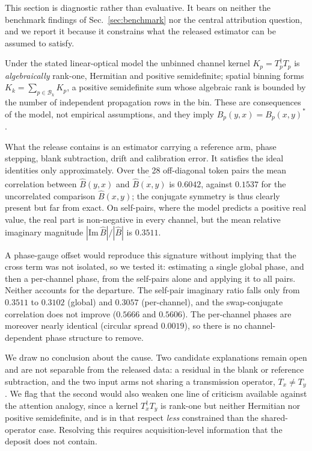 \documentclass[11pt,a4paper]{article}
\begin{document}
This section is diagnostic rather than evaluative. It bears on neither the
benchmark findings of Sec.~\ref{sec:benchmark} nor the central attribution
question, and we report it because it constrains what the released estimator
can be assumed to satisfy.

Under the stated linear-optical model the unbinned channel kernel
$K_p = T_p^{\dagger}T_p$ is \emph{algebraically} rank-one, Hermitian and
positive semidefinite; spatial binning forms $K_k=\sum_{p\in\mathcal{B}_k}K_p$,
a positive semidefinite sum whose algebraic rank is bounded by the number of
independent propagation rows in the bin. These are consequences of the model,
not empirical assumptions, and they imply $B_p(y,x)=B_p(x,y)^{\ast}$.

What the release contains is an estimator carrying a reference arm, phase
stepping, blank subtraction, drift and calibration error. It satisfies the
ideal identities only approximately. Over the 28 off-diagonal token pairs the
mean correlation between $\widehat B(y,x)$ and $\overline{\widehat B(x,y)}$ is
$0.6042$, against $0.1537$ for the uncorrelated comparison $\widehat B(x,y)$;
the conjugate symmetry is thus clearly present but far from exact. On
self-pairs, where the model predicts a positive real value, the real part is
non-negative in every channel, but the mean relative imaginary magnitude
$|\mathrm{Im}\,\widehat B|/|\widehat B|$ is $0.3511$.

A phase-gauge offset would reproduce this signature without implying that the
cross term was not isolated, so we tested it: estimating a single global phase,
and then a per-channel phase, from the self-pairs alone and applying it to all
pairs. Neither accounts for the departure. The self-pair imaginary ratio falls
only from $0.3511$ to $0.3102$ (global) and $0.3057$ (per-channel), and the
swap-conjugate correlation does not improve ($0.5666$ and $0.5606$). The
per-channel phases are moreover nearly identical (circular spread $0.0019$), so
there is no channel-dependent phase structure to remove.

We draw no conclusion about the cause. Two candidate explanations remain open
and are not separable from the released data: a residual in the blank or
reference subtraction, and the two input arms not sharing a transmission
operator, $T_x \neq T_y$. We flag that the second would also weaken one line
of criticism available against the attention analogy, since a kernel
$T_x^{\dagger}T_y$ is rank-one but neither Hermitian nor positive
semidefinite, and is in that respect \emph{less} constrained than the
shared-operator case. Resolving this requires acquisition-level information
that the deposit does not contain.
\end{document}
